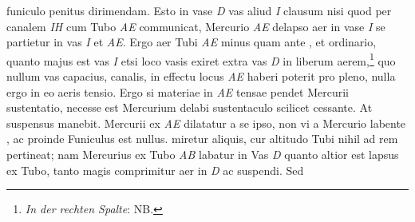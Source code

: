 funiculo\protect{} penitus dirimendam.  Esto in vase \textit{D} vas aliud \textit{I} clausum nisi  quod per canalem \textit{IH} cum Tubo \textit{AE} communicat, Mercurio\protect{} \textit{AE} delapso aer in vase \textit{I} se partietur  in vas \textit{I} et  \textit{AE}. Ergo aer Tubi \textit{AE} minus quam ante , et  ordinario, quanto majus est vas \textit{I} etsi loco vasis  exiret extra  vas \textit{D} in liberum aerem,\footnote{\textit{In der rechten Spalte}:  NB.} quo nullum vas capacius,  canalis, in effectu locus \textit{AE} haberi  poterit pro pleno, nulla ergo in eo aeris tensio\protect{}.  Ergo si  materiae in \textit{AE}  tensae pendet Mercurii\protect{} sustentatio, necesse est Mercurium\protect{} delabi sustentaculo scilicet cessante.  At suspensus manebit.   Mercurii\protect{} ex \textit{AE} dilatatur a se ipso,  non vi a Mercurio\protect{} labente , ac  proinde Funiculus\protect{} est 
nullus.\pend \pstart
{} miretur aliquis, cur altitudo  Tubi nihil ad rem pertineat; nam  Mercurius\protect{} ex Tubo \textit{AB} labatur in Vas \textit{D} quanto altior est lapsus ex Tubo, tanto magis  comprimitur aer in \textit{D} ac  suspendi. Sed 